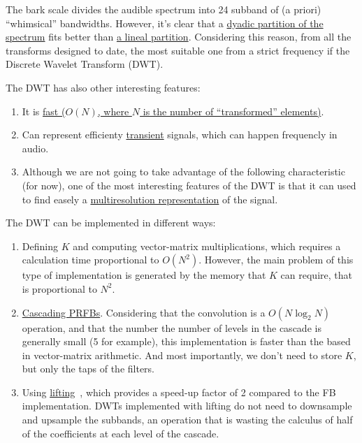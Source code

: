 The bark scale divides the audible spectrum into 24 subband of (a
priori) ``whimsical'' bandwidths. However, it's clear that a
\href{https://en.wikipedia.org/wiki/Octave_band}{dyadic partition of
  the spectrum} fits better than
\href{https://en.wikipedia.org/wiki/Wavelet_transform#Principle}{a
  lineal partition}. Considering this reason, from all the transforms
designed to date, the most suitable one from a strict frequency if the
Discrete Wavelet Transform (DWT).

The DWT has also other interesting features:
\begin{enumerate}
\item It is
  \href{https://en.wikipedia.org/wiki/Discrete_wavelet_transform#Time_complexity}{fast
    ($O(N)$, where $N$ is the number of ``transformed'' elements)}.
\item Can represent efficienty
  \href{https://en.wikipedia.org/wiki/Transient_(oscillation)}{transient}
  signals, which can happen frequencly in audio.
\item Although we are not going to take advantage of the following
  characteristic (for now), one of the most interesting features of
  the DWT is that it can used to find easely a
  \href{https://en.wikipedia.org/wiki/Multiresolution_analysis}{multiresolution
    representation} of the signal.
\end{enumerate}

The DWT can be implemented in different ways:
\begin{enumerate}
\item Defining $K$ and computing vector-matrix multiplications, which
  requires a calculation time proportional to $O(N^2)$. However, the
  main problem of this type of implementation is generated by the
  memory that $K$ can require, that is proportional to $N^2$.
\item
  \href{https://en.wikipedia.org/wiki/Discrete_wavelet_transform#Cascading_and_filter_banks}{Cascading
    PRFBs}. Considering that the convolution is a $O(N\log_2N)$
  operation, and that the number the number of levels in the cascade
  is generally small (5 for example), this implementation is faster
  than the based in vector-matrix arithmetic. And most importantly, we
  don't need to store $K$, but only the taps of the filters.
\item Using
  \href{https://en.wikipedia.org/wiki/Lifting_scheme}{lifting}~\cite{sweldens1997building},
  which provides a speed-up factor of 2 compared to the FB
  implementation. DWTs implemented with lifting do not need to
  downsample and upsample the subbands, an operation that is wasting
  the calculus of half of the coefficients at each level of the
  cascade.
\end{enumerate}

